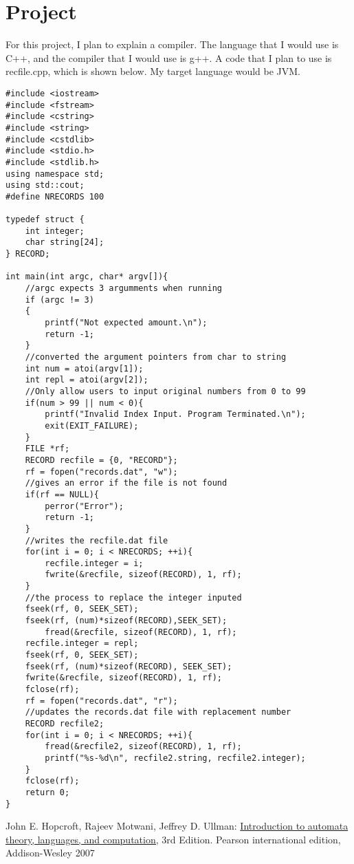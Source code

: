 \documentclass{article}
\theoremstyle{theorem}
\theoremstyle{definition}
\theoremstyle{remark}
\begin{document}
\section{Project}
For this project, I plan to explain a compiler. The language that I would use is C++, and the compiler that I would use is g++. A code that I plan to use is recfile.cpp, which is shown below. My target language would be JVM.
\begin{lstlisting}
#include <iostream>
#include <fstream>
#include <cstring>
#include <string>
#include <cstdlib>
#include <stdio.h>
#include <stdlib.h>
using namespace std;
using std::cout;
#define NRECORDS 100

typedef struct {
	int integer;
	char string[24];
} RECORD;

int main(int argc, char* argv[]){
	//argc expects 3 argumments when running
	if (argc != 3)
	{
		printf("Not expected amount.\n");
		return -1;
	}
	//converted the argument pointers from char to string
	int num = atoi(argv[1]);
	int repl = atoi(argv[2]);
	//Only allow users to input original numbers from 0 to 99
	if(num > 99 || num < 0){
		printf("Invalid Index Input. Program Terminated.\n");
		exit(EXIT_FAILURE);
	}
	FILE *rf;
	RECORD recfile = {0, "RECORD"};
	rf = fopen("records.dat", "w");
	//gives an error if the file is not found
	if(rf == NULL){
		perror("Error");
		return -1;
	}
	//writes the recfile.dat file
	for(int i = 0; i < NRECORDS; ++i){
		recfile.integer = i;
		fwrite(&recfile, sizeof(RECORD), 1, rf);
	}
	//the process to replace the integer inputed
	fseek(rf, 0, SEEK_SET);
	fseek(rf, (num)*sizeof(RECORD),SEEK_SET);
       	fread(&recfile, sizeof(RECORD), 1, rf);
	recfile.integer = repl;
	fseek(rf, 0, SEEK_SET);
	fseek(rf, (num)*sizeof(RECORD), SEEK_SET);
	fwrite(&recfile, sizeof(RECORD), 1, rf);	
	fclose(rf);
	rf = fopen("records.dat", "r");
	//updates the records.dat file with replacement number
	RECORD recfile2;
	for(int i = 0; i < NRECORDS; ++i){
		fread(&recfile2, sizeof(RECORD), 1, rf);
		printf("%s-%d\n", recfile2.string, recfile2.integer);
	}
	fclose(rf);
	return 0; 
}	
\end{lstlisting}
\begin{thebibliography}{99}
	John E. Hopcroft, Rajeev Motwani, Jeffrey D. Ullman:
\href{http://ce.sharif.edu/courses/94-95/1/ce414-2/resources/root/Text%20Books/Automata/John%20E.%20Hopcroft,%20Rajeev%20Motwani,%20Jeffrey%20D.%20Ullman-Introduction%20to%20Automata%20Theory,%20Languages,%20and%20Computations-Prentice%20Hall%20(2006).pdf}{Introduction to automata theory, languages, and computation,} 3rd Edition. Pearson international edition, Addison-Wesley 2007

\end{thebibliography}
\end{document}
